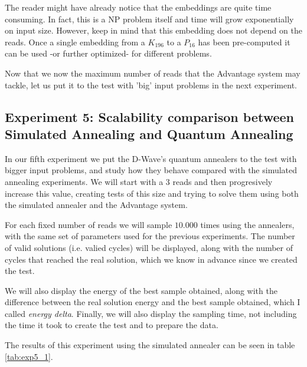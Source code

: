The reader might have already notice that the embeddings are quite time consuming. In fact, this is a NP problem itself and time will grow exponentially on input size. However, keep in mind that this embedding does not depend on the reads. Once a single embedding from a $K_{196}$ to a $P_{16}$ has been pre-computed it can be used -or further optimized- for different problems.

Now that we now the maximum number of reads that the Advantage system may tackle, let us put it to the test with 'big' input problems in the next experiment.


\subsection{Experiment 5: Scalability comparison between Simulated Annealing and Quantum Annealing}


In our fifth experiment we put the D-Wave's quantum annealers to the test with bigger input problems, and study how they behave compared with the simulated annealing experiments. We will start with a $3$ reads and then progresively increase this value, creating tests of this size and trying to solve them using both the simulated annealer and the Advantage system.

For each fixed number of reads we will sample $10.000$ times using the annealers, with the same set of parameters used for the previous experiments. The number of valid solutions (i.e. valied cycles) will be displayed, along with the number of cycles that reached the real solution, which we know in advance since we created the test.

We will also display the energy of the best sample obtained, along with the difference between the real solution energy and the best sample obtained, which I called \emph{energy delta}. Finally, we will also display the sampling time, not including the time it took to create the test and to prepare the data.

The results of this experiment using the simulated annealer can be seen in table \ref{tab:exp5_1}. 

